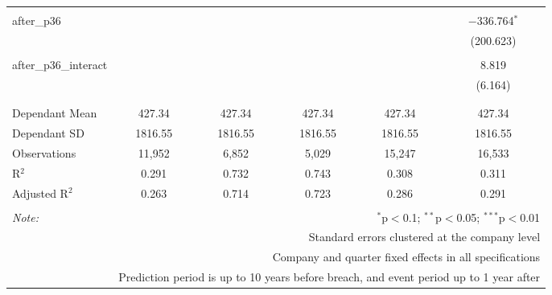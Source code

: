 \begin{table}[!htbp]
\begin{tabular}{@{\extracolsep{5pt}}lccccc}
  & & & & & \\ 
 after\_p36 &  &  &  &  & $-$336.764$^{*}$ \\ 
  &  &  &  &  & (200.623) \\ 
  & & & & & \\ 
 after\_p36\_interact &  &  &  &  & 8.819 \\ 
  &  &  &  &  & (6.164) \\ 
  & & & & & \\ 
\hline \\[-1.8ex] 
Dependant Mean & 427.34 & 427.34 & 427.34 & 427.34 & 427.34 \\ 
Dependant SD & 1816.55 & 1816.55 & 1816.55 & 1816.55 & 1816.55 \\ 
Observations & 11,952 & 6,852 & 5,029 & 15,247 & 16,533 \\ 
R$^{2}$ & 0.291 & 0.732 & 0.743 & 0.308 & 0.311 \\ 
Adjusted R$^{2}$ & 0.263 & 0.714 & 0.723 & 0.286 & 0.291 \\ 
\hline 
\hline \\[-1.8ex] 
\textit{Note:}  & \multicolumn{5}{r}{$^{*}$p$<$0.1; $^{**}$p$<$0.05; $^{***}$p$<$0.01} \\ 
 & \multicolumn{5}{r}{Standard errors clustered at the company level} \\ 
 & \multicolumn{5}{r}{Company and quarter fixed effects in all specifications} \\ 
 & \multicolumn{5}{r}{Prediction period is up to 10 years before breach, and event period up to 1 year after} \\ 
\end{tabular} 
\end{table} 

